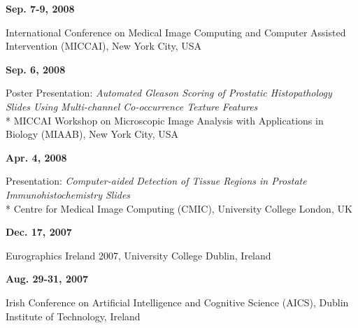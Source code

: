 \documentclass[line,a4paper]{resume}
\begin{document}
\begin{resume}
\begin{minipage}[t]{0.80\linewidth}
\end{minipage}

\noindent
\begin{minipage}[t]{0.20\linewidth}
\textbf{Sep. 7-9, 2008}
\end{minipage}
\begin{minipage}[t]{0.80\linewidth}\raggedright
International Conference on Medical Image Computing and Computer Assisted Intervention (MICCAI), New York City, USA
\end{minipage}

\noindent
\begin{minipage}[t]{0.20\linewidth}
\textbf{Sep. 6, 2008}
\end{minipage}
\begin{minipage}[t]{0.80\linewidth}\raggedright
Poster Presentation: \emph{Automated Gleason Scoring of Prostatic Histopathology Slides Using Multi-channel Co-occurrence Texture Features}\\*
MICCAI Workshop on Microscopic Image Analysis with Applications in Biology (MIAAB), New York City, USA
\end{minipage}

\noindent
\begin{minipage}[t]{0.20\linewidth}
\textbf{Apr. 4, 2008}
\end{minipage}
\begin{minipage}[t]{0.80\linewidth}\raggedright
Presentation: \emph{Computer-aided Detection of Tissue Regions in Prostate Immunohistochemistry Slides}\\*
Centre for Medical Image Computing (CMIC), University College London, UK
\end{minipage}

\noindent
\begin{minipage}[t]{0.20\linewidth}
\textbf{Dec. 17, 2007}
\end{minipage}
\begin{minipage}[t]{0.80\linewidth}\raggedright
Eurographics Ireland 2007, University College Dublin, Ireland
\end{minipage}

\noindent
\begin{minipage}[t]{0.20\linewidth}
\textbf{Aug. 29-31, 2007}
\end{minipage}
\begin{minipage}[t]{0.80\linewidth}\raggedright
Irish Conference on Artificial Intelligence and Cognitive Science (AICS), Dublin Institute of Technology, Ireland
\end{minipage}


\end{resume}
\end{document}
